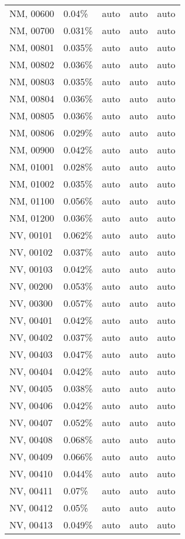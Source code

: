 \begin{longtable}[]{@{}lllll@{}}
NM, 00600 & 0.04\% & auto & auto & auto \\
NM, 00700 & 0.031\% & auto & auto & auto \\
NM, 00801 & 0.035\% & auto & auto & auto \\
NM, 00802 & 0.036\% & auto & auto & auto \\
NM, 00803 & 0.035\% & auto & auto & auto \\
NM, 00804 & 0.036\% & auto & auto & auto \\
NM, 00805 & 0.036\% & auto & auto & auto \\
NM, 00806 & 0.029\% & auto & auto & auto \\
NM, 00900 & 0.042\% & auto & auto & auto \\
NM, 01001 & 0.028\% & auto & auto & auto \\
NM, 01002 & 0.035\% & auto & auto & auto \\
NM, 01100 & 0.056\% & auto & auto & auto \\
NM, 01200 & 0.036\% & auto & auto & auto \\
NV, 00101 & 0.062\% & auto & auto & auto \\
NV, 00102 & 0.037\% & auto & auto & auto \\
NV, 00103 & 0.042\% & auto & auto & auto \\
NV, 00200 & 0.053\% & auto & auto & auto \\
NV, 00300 & 0.057\% & auto & auto & auto \\
NV, 00401 & 0.042\% & auto & auto & auto \\
NV, 00402 & 0.037\% & auto & auto & auto \\
NV, 00403 & 0.047\% & auto & auto & auto \\
NV, 00404 & 0.042\% & auto & auto & auto \\
NV, 00405 & 0.038\% & auto & auto & auto \\
NV, 00406 & 0.042\% & auto & auto & auto \\
NV, 00407 & 0.052\% & auto & auto & auto \\
NV, 00408 & 0.068\% & auto & auto & auto \\
NV, 00409 & 0.066\% & auto & auto & auto \\
NV, 00410 & 0.044\% & auto & auto & auto \\
NV, 00411 & 0.07\% & auto & auto & auto \\
NV, 00412 & 0.05\% & auto & auto & auto \\
NV, 00413 & 0.049\% & auto & auto & auto \\

\end{longtable}
